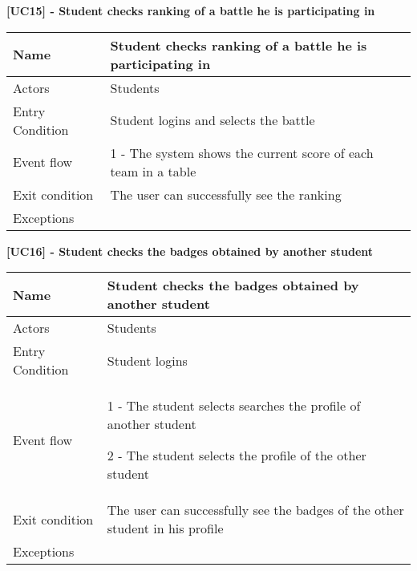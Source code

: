     \begin{table}[htb]
    \textbf{[UC15] - Student checks ranking of a battle he is participating in}
    
      \centering
      \begin{tabular}{|p{3cm}|p{14cm}|}
        \hline
         Name & Student checks ranking of a battle he is participating in \\
        \hline
        Actors & Students \\
        \hline
        Entry Condition & Student logins and selects the battle \\
        \hline
        Event flow &  1 - The system shows the current score of each team in a table
        \\
        \hline
        Exit condition & The user can successfully see the ranking \\
        \hline
        Exceptions &
        \\
        \hline
      \end{tabular}
      
    \end{table}

    \begin{table}[htb]
    \textbf{[UC16] - Student checks the badges obtained by another student}
    
      \centering
      \begin{tabular}{|p{3cm}|p{14cm}|}
        \hline
         Name & Student checks the badges obtained by another student \\
        \hline
        Actors & Students \\
        \hline
        Entry Condition & Student logins \\
        \hline
        Event flow &  1 - The student selects searches the profile of another student

        2 - The student selects the profile of the other student
        
        \\
        \hline
        Exit condition & The user can successfully see the badges of the other student in his profile \\
        \hline
        Exceptions &
        \\
        \hline
      \end{tabular}
      
    \end{table}